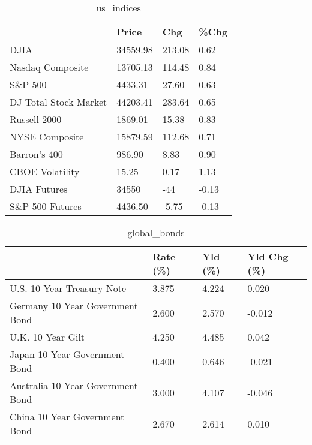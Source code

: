 \documentclass{article}%
\begin{document}
%


\begin{table}[htbp]%
\caption{us\_indices}%
\centering%
\begin{adjustbox}{width=1\textwidth}%
\begin{tabular}{llll}
\toprule
                      &    Price &    Chg &  \%Chg \\
\midrule
                 DJIA & 34559.98 & 213.08 &  0.62 \\
     Nasdaq Composite & 13705.13 & 114.48 &  0.84 \\
              S\&P 500 &  4433.31 &  27.60 &  0.63 \\
DJ Total Stock Market & 44203.41 & 283.64 &  0.65 \\
         Russell 2000 &  1869.01 &  15.38 &  0.83 \\
       NYSE Composite & 15879.59 & 112.68 &  0.71 \\
         Barron's 400 &   986.90 &   8.83 &  0.90 \\
      CBOE Volatility &    15.25 &   0.17 &  1.13 \\
         DJIA Futures &    34550 &    -44 & -0.13 \\
      S\&P 500 Futures &  4436.50 &  -5.75 & -0.13 \\
\bottomrule
\end{tabular}
%
\end{adjustbox}%
\end{table}

%


\begin{table}[htbp]%
\caption{global\_bonds}%
\centering%
\begin{adjustbox}{width=1\textwidth}%
\begin{tabular}{llll}
\toprule
                                  & Rate (\%) & Yld (\%) & Yld Chg (\%) \\
\midrule
       U.S. 10 Year Treasury Note &    3.875 &   4.224 &       0.020 \\
  Germany 10 Year Government Bond &    2.600 &   2.570 &      -0.012 \\
                U.K. 10 Year Gilt &    4.250 &   4.485 &       0.042 \\
    Japan 10 Year Government Bond &    0.400 &   0.646 &      -0.021 \\
Australia 10 Year Government Bond &    3.000 &   4.107 &      -0.046 \\
    China 10 Year Government Bond &    2.670 &   2.614 &       0.010 \\
\bottomrule
\end{tabular}
%
\end{adjustbox}%
\end{table}
\end{document}
